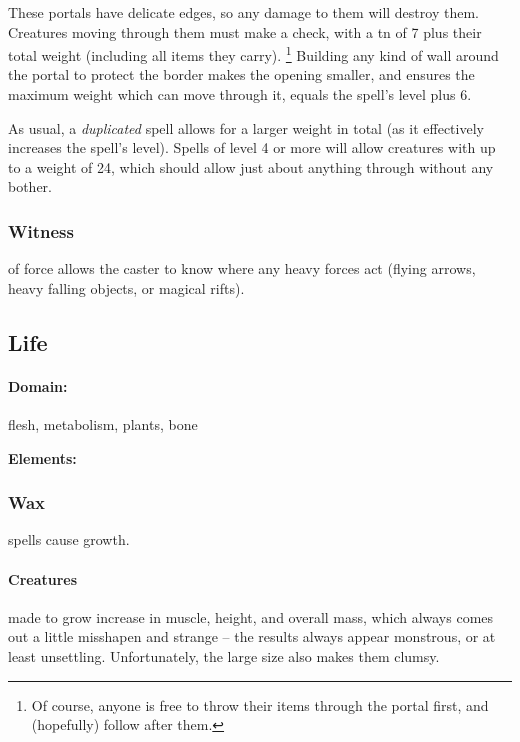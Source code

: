 \begin{multicols}{2}
These portals have delicate edges, so any damage to them will destroy them.
Creatures moving through them must make a  check, with a \gls{tn} of 7 plus their total \gls{weight} (including all items they carry).%
\footnote{Of course, anyone is free to throw their items through the portal first, and (hopefully) follow after them.}
Building any kind of wall around the portal to protect the border makes the opening smaller, and ensures the maximum \gls{weight} which can move through it, equals the spell's level plus 6.

As usual, a \textit{duplicated} spell allows for a larger \gls{weight} in total (as it effectively increases the spell's level).
Spells of level 4 or more will allow creatures with up to a \gls{weight} of 24, which should allow just about anything through without any bother.

\subsubsection{Witness}
of force allows the caster to know where any heavy forces act (flying arrows, heavy falling objects, or magical rifts).

\subsection{Life}
\paragraph{Domain:}
flesh, metabolism, plants, bone

\textbf{Elements:}

\subsubsection{Wax}
spells cause growth.

\paragraph{Creatures}
made to grow increase in muscle, height, and overall mass, which always comes out a little misshapen and strange -- the results always appear monstrous, or at least unsettling.
Unfortunately, the large size also makes them clumsy.


\end{multicols}
